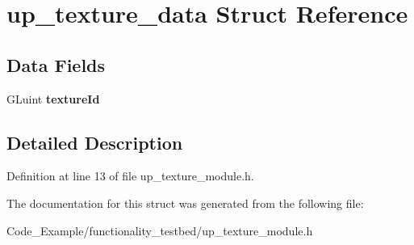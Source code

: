 \hypertarget{structup__texture__data}{}\section{up\+\_\+texture\+\_\+data Struct Reference}
\label{structup__texture__data}
\subsection*{Data Fields}
\begin{DoxyCompactItemize}
\item 
\hypertarget{structup__texture__data_a748ff5115c8b3b65daec06945c822353}{}G\+Luint {\bfseries texture\+Id}\label{structup__texture__data_a748ff5115c8b3b65daec06945c822353}

\end{DoxyCompactItemize}


\subsection{Detailed Description}


Definition at line 13 of file up\+\_\+texture\+\_\+module.\+h.



The documentation for this struct was generated from the following file\+:\begin{DoxyCompactItemize}
\item 
Code\+\_\+\+Example/functionality\+\_\+testbed/up\+\_\+texture\+\_\+module.\+h\end{DoxyCompactItemize}
